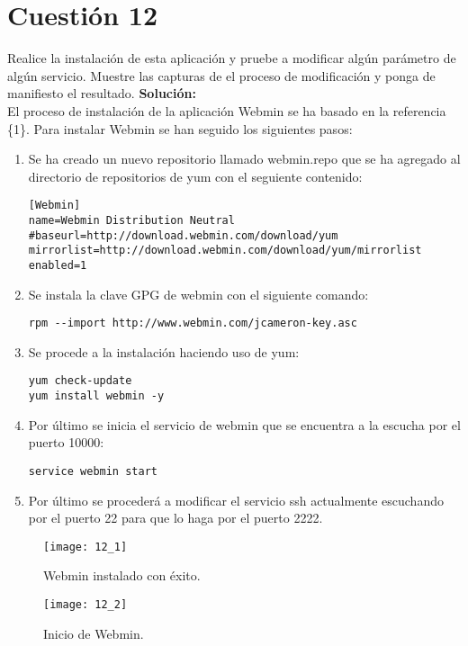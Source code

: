 \documentclass[a4paper, 11pt]{article} %
\begin{document}
\section{Cuestión 12}
Realice la instalación de esta aplicación y pruebe a modificar algún parámetro de algún servicio. Muestre las capturas de el proceso de modificación y ponga de manifiesto el resultado.
\textbf{Solución:}\\
El proceso de instalación de la aplicación Webmin se ha basado en la referencia \{1\}. Para instalar Webmin se han seguido los siguientes pasos:
\begin{enumerate}
\item Se ha creado un nuevo repositorio llamado webmin.repo que se ha agregado al directorio de repositorios de yum con el seguiente contenido:
\begin{verbatim}
[Webmin]
name=Webmin Distribution Neutral
#baseurl=http://download.webmin.com/download/yum
mirrorlist=http://download.webmin.com/download/yum/mirrorlist
enabled=1
\end{verbatim}
\item Se instala la clave GPG de webmin con el siguiente comando:
\begin{verbatim}
rpm --import http://www.webmin.com/jcameron-key.asc
\end{verbatim}
\item Se procede a la instalación haciendo uso de yum:
\begin{verbatim}
yum check-update
yum install webmin -y
\end{verbatim}
\item Por último se inicia el servicio de webmin que se encuentra a la escucha por el puerto 10000:
\begin{verbatim}
service webmin start
\end{verbatim}
\item Por último se procederá a modificar el servicio ssh actualmente escuchando por el puerto 22 para que lo haga por el puerto 2222.
\end{enumerate}
\begin{figure}[h]
\centering 
\texttt{[image: 12\_1]} 
\caption{Webmin instalado con éxito.} 
\vspace{-0.5cm}
\label{contexto:figura} 
\end{figure}
\begin{figure}[h]
\centering 
\texttt{[image: 12\_2]} 
\caption{Inicio de Webmin.} 
\vspace{-0.5cm}
\label{contexto:figura} 
\end{figure}
\newpage
\end{document}

